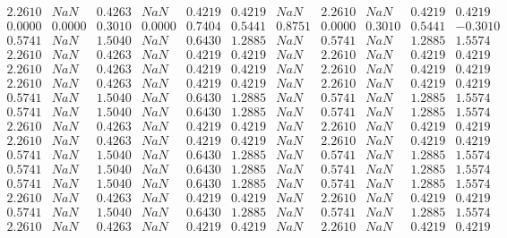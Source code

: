 
    \begin{small}
        ~
        \[ \begin{array}{llllllllllllllll}
               2.2610 & NaN    & 0.4263 & NaN    & 0.4219 & 0.4219 & NaN    & 2.2610 & NaN    & 0.4219 & 0.4219  \\
               0.0000 & 0.0000 & 0.3010 & 0.0000 & 0.7404 & 0.5441 & 0.8751 & 0.0000 & 0.3010 & 0.5441 & -0.3010 \\
               0.5741 & NaN    & 1.5040 & NaN    & 0.6430 & 1.2885 & NaN    & 0.5741 & NaN    & 1.2885 & 1.5574  \\
               2.2610 & NaN    & 0.4263 & NaN    & 0.4219 & 0.4219 & NaN    & 2.2610 & NaN    & 0.4219 & 0.4219  \\
               2.2610 & NaN    & 0.4263 & NaN    & 0.4219 & 0.4219 & NaN    & 2.2610 & NaN    & 0.4219 & 0.4219  \\
               2.2610 & NaN    & 0.4263 & NaN    & 0.4219 & 0.4219 & NaN    & 2.2610 & NaN    & 0.4219 & 0.4219  \\
               0.5741 & NaN    & 1.5040 & NaN    & 0.6430 & 1.2885 & NaN    & 0.5741 & NaN    & 1.2885 & 1.5574  \\
               0.5741 & NaN    & 1.5040 & NaN    & 0.6430 & 1.2885 & NaN    & 0.5741 & NaN    & 1.2885 & 1.5574  \\
               2.2610 & NaN    & 0.4263 & NaN    & 0.4219 & 0.4219 & NaN    & 2.2610 & NaN    & 0.4219 & 0.4219  \\
               2.2610 & NaN    & 0.4263 & NaN    & 0.4219 & 0.4219 & NaN    & 2.2610 & NaN    & 0.4219 & 0.4219  \\
               0.5741 & NaN    & 1.5040 & NaN    & 0.6430 & 1.2885 & NaN    & 0.5741 & NaN    & 1.2885 & 1.5574  \\
               0.5741 & NaN    & 1.5040 & NaN    & 0.6430 & 1.2885 & NaN    & 0.5741 & NaN    & 1.2885 & 1.5574  \\
               0.5741 & NaN    & 1.5040 & NaN    & 0.6430 & 1.2885 & NaN    & 0.5741 & NaN    & 1.2885 & 1.5574  \\
               2.2610 & NaN    & 0.4263 & NaN    & 0.4219 & 0.4219 & NaN    & 2.2610 & NaN    & 0.4219 & 0.4219  \\
               0.5741 & NaN    & 1.5040 & NaN    & 0.6430 & 1.2885 & NaN    & 0.5741 & NaN    & 1.2885 & 1.5574  \\
               2.2610 & NaN    & 0.4263 & NaN    & 0.4219 & 0.4219 & NaN    & 2.2610 & NaN    & 0.4219 & 0.4219
        \end{array}\]
    \end{small}
    \newpage

